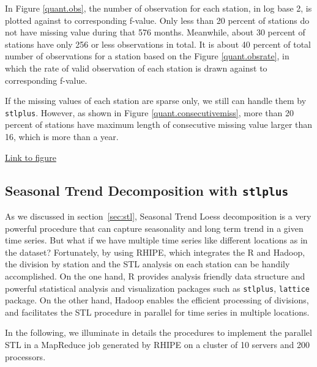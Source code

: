 In Figure \href{../plots/a1950/a1950.obs.station.pdf}{\ref*{quant.obs}}, the 
number of observation for each station, in log base 2, is plotted against to 
corresponding f-value. Only less than 20 percent of stations do not have missing
value during that 576 months. Meanwhile, about 30 percent of stations have only
256 or less observations in total. It is about 40 percent of total number of 
observations for a station based on the Figure 
\href{../plots/a1950/a1950.obsrate.station.pdf}{\ref*{quant.obsrate}}, in which 
the rate of valid observation of each station is drawn against to corresponding 
f-value.

If the missing values of each station are sparse only, we still can handle them 
by \texttt{stlplus}. However, as shown in Figure 
\href{../plots/a1950/a1950.consecutive.miss.station.pdf}{\ref*{quant.consecutivemiss}},
more than 20 percent of stations have maximum length of consecutive missing value 
larger than 16, which is more than a year. 

\begin{framed}
\begin{center}
  \href{../plots/a1950/a1950.consecutive.miss.station.pdf}{Link to figure}
  \label{quant.consecutivemiss}
\end{center}
\end{framed}

\subsection{Seasonal Trend Decomposition with \texttt{stlplus}}
\label{sec:a1950.stl}

As we discussed in section~\ref{sec:stl}, Seasonal Trend Loess decomposition is 
a very powerful procedure that can capture seasonality and long term trend in a
given time series. But what if we have multiple time series like different 
locations as in the dataset? Fortunately, by using RHIPE, which integrates the R 
and Hadoop, the division by station and the STL analysis on each station can be 
handily accomplished. On the one hand, R provides analysis friendly data structure 
and powerful statistical analysis and visualization packages such as 
\texttt{stlplus}, \texttt{lattice} package. On the other hand, Hadoop enables the
efficient processing of divisions, and facilitates the STL procedure in parallel
for time series in multiple locations. 

In the following, we illuminate in details the procedures to implement the parallel
STL in a MapReduce job generated by RHIPE on a cluster of 10 servers and 200 
processors.



